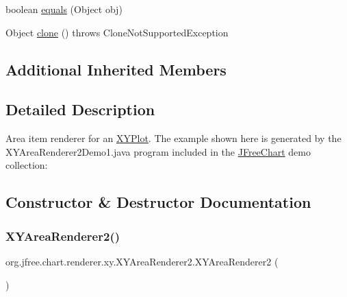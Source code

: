 \begin{DoxyCompactItemize}
\item 
boolean \mbox{\hyperlink{classorg_1_1jfree_1_1chart_1_1renderer_1_1xy_1_1_x_y_area_renderer2_a9b9cd98fa1b43f272cd9cf4ebb4395bb}{equals}} (Object obj)
\item 
Object \mbox{\hyperlink{classorg_1_1jfree_1_1chart_1_1renderer_1_1xy_1_1_x_y_area_renderer2_aef8f56ee48f7533153ababbfe83b4e2f}{clone}} ()  throws Clone\+Not\+Supported\+Exception 
\end{DoxyCompactItemize}
\subsection*{Additional Inherited Members}


\subsection{Detailed Description}
Area item renderer for an \mbox{\hyperlink{}{X\+Y\+Plot}}. The example shown here is generated by the {\ttfamily X\+Y\+Area\+Renderer2\+Demo1.\+java} program included in the \mbox{\hyperlink{classorg_1_1jfree_1_1chart_1_1_j_free_chart}{J\+Free\+Chart}} demo collection\+: ~\newline
~\newline
  

\subsection{Constructor \& Destructor Documentation}
\mbox{\label{classorg_1_1jfree_1_1chart_1_1renderer_1_1xy_1_1_x_y_area_renderer2_a5b4f5eb7eb9224acdb1aeb1e825f5c77}} 
\subsubsection{\texorpdfstring{X\+Y\+Area\+Renderer2()}{XYAreaRenderer2()}\hspace{0.1cm}{\footnotesize\ttfamily [1/2]}}
{\footnotesize\ttfamily org.\+jfree.\+chart.\+renderer.\+xy.\+X\+Y\+Area\+Renderer2.\+X\+Y\+Area\+Renderer2 (\begin{DoxyParamCaption}{ }\end{DoxyParamCaption})}

